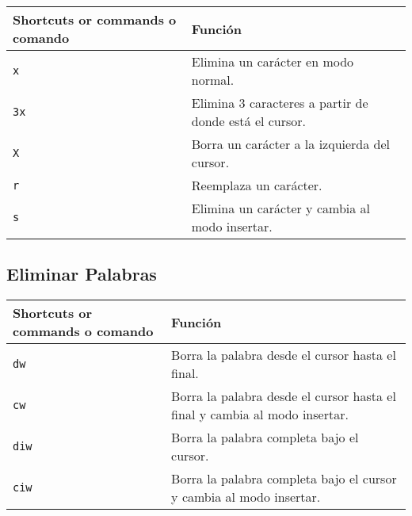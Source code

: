 \documentclass[
  doc,
  floatsintext,
  longtable,
  a4paper,
  nolmodern,
  notxfonts,
  notimes,
  colorlinks=true,linkcolor=blue,citecolor=blue,urlcolor=blue]{apa7}
\begin{document}
\begin{longtable}[]{@{}
  >{\raggedright\arraybackslash}p{}
  >{\raggedright\arraybackslash}p{}@{}}
\toprule\noalign{}
\begin{minipage}[b]{\linewidth}\raggedright
Shortcuts or commands o comando
\end{minipage} & \begin{minipage}[b]{\linewidth}\raggedright
Función
\end{minipage} \\
\midrule\noalign{}
\endhead
\bottomrule\noalign{}
\endlastfoot
\texttt{x} & Elimina un carácter en modo normal. \\
\texttt{3x} & Elimina 3 caracteres a partir de donde está el cursor. \\
\texttt{X} & Borra un carácter a la izquierda del cursor. \\
\texttt{r} & Reemplaza un carácter. \\
\texttt{s} & Elimina un carácter y cambia al modo insertar. \\
\end{longtable}

\subsection{Eliminar Palabras}\label{eliminar-palabras}

\begin{longtable}[]{@{}
  >{\raggedright\arraybackslash}p{}
  >{\raggedright\arraybackslash}p{}@{}}
\toprule\noalign{}
\begin{minipage}[b]{\linewidth}\raggedright
Shortcuts or commands o comando
\end{minipage} & \begin{minipage}[b]{\linewidth}\raggedright
Función
\end{minipage} \\
\midrule\noalign{}
\endhead
\bottomrule\noalign{}
\endlastfoot
\texttt{dw} & Borra la palabra desde el cursor hasta el final. \\
\texttt{cw} & Borra la palabra desde el cursor hasta el final y cambia
al modo insertar. \\
\texttt{diw} & Borra la palabra completa bajo el cursor. \\
\texttt{ciw} & Borra la palabra completa bajo el cursor y cambia al modo
insertar. \\
\end{longtable}
\end{document}
